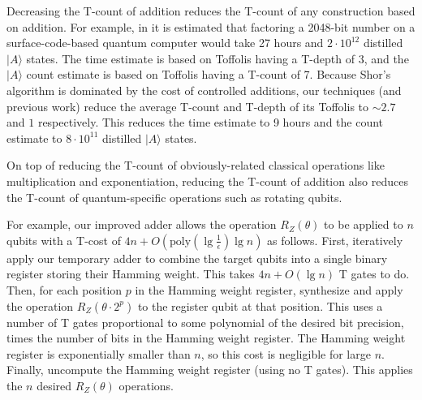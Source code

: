 \documentclass[twocolumn]{revtex4-1}
\begin{document}
Decreasing the T-count of addition reduces the T-count of any construction based on addition.
For example, in \citep{Fowler2012} it is estimated that factoring a 2048-bit number on a surface-code-based quantum computer would take 27 hours and $2 \cdot 10^{12}$ distilled $|A\rangle$ states.
The time estimate is based on Toffolis having a T-depth of 3, and the $|A\rangle$ count estimate is based on Toffolis having a T-count of 7.
Because Shor's algorithm is dominated by the cost of controlled additions, our techniques (and previous work) reduce the average T-count and T-depth of its Toffolis to $\sim 2.7$ and $1$ respectively.
This reduces the time estimate to 9 hours and the count estimate to $8 \cdot 10^{11}$ distilled $|A\rangle$ states.

On top of reducing the T-count of obviously-related classical operations like multiplication and exponentiation, reducing the T-count of addition also reduces the T-count of quantum-specific operations such as rotating qubits.

For example, our improved adder allows the operation $R_Z(\theta)$ to be applied to $n$ qubits with a T-cost of $4n + O(\text{poly}(\lg \frac{1}{\epsilon}) \lg n)$ as follows.
First, iteratively apply our temporary adder to combine the target qubits into a single binary register storing their Hamming weight.
This takes $4n + O(\lg n)$ T gates to do.
Then, for each position $p$ in the Hamming weight register, synthesize and apply the operation $R_Z(\theta \cdot 2^p)$ to the register qubit at that position.
This uses a number of T gates proportional to some polynomial of the desired bit precision, times the number of bits in the Hamming weight register.
The Hamming weight register is exponentially smaller than $n$, so this cost is negligible for large $n$.
Finally, uncompute the Hamming weight register (using no T gates).
This applies the $n$ desired $R_Z(\theta)$ operations.
\end{document}
